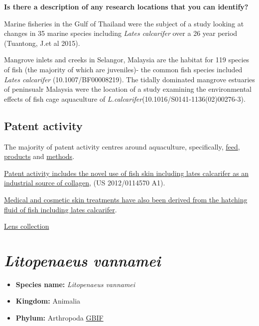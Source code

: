 \documentclass[]{book}
\providecommand{\tightlist}{%
  \setlength{\itemsep}{0pt}\setlength{\parskip}{0pt}}
\theoremstyle{definition}
\theoremstyle{definition}
\theoremstyle{definition}
\theoremstyle{remark}
\begin{document}
\textbf{Is there a description of any research locations that you can
identify?}

Marine fisheries in the Gulf of Thailand were the subject of a study
looking at changes in 35 marine species including \emph{Lates
calcarifer} over a 26 year period (Tuantong, J.et al 2015).

Mangrove inlets and creeks in Selangor, Malaysia are the habitat for 119
species of fish (the majority of which are juveniles)- the common fish
species included \emph{Lates calcarifer} (10.1007/BF00008219). The
tidally dominated mangrove estuaries of peninsualr Malaysia were the
location of a study examining the environmental effects of fish cage
aquaculture of \emph{L.calcarifer}(10.1016/S0141-1136(02)00276-3).

\hypertarget{patent-activity-1}{%
\subsection{Patent activity}\label{patent-activity-1}}

The majority of patent activity centres around aquaculture,
specifically, \href{WO\%202008/084074\%20A2}{feed},
\href{WO\%202010/027788\%20A1}{products} and
\href{WO\%202009/063044\%20A1}{methods}.

\href{US\%202012/0114570\%20A1}{Patent activity includes the novel use
of fish skin including lates calcarifer as an industrial source of
collagen}, (US 2012/0114570 A1).

\href{WO\%202014/094918\%20A1}{Medical and cosmetic skin treatments have
also been derived from the hatching fluid of fish including lates
calcarifer}.

\href{https://www.lens.org/lens/collection/25319}{Lens collection}

\hypertarget{litopenaeus-vannamei}{%
\section{\texorpdfstring{\emph{Litopenaeus
vannamei}}{Litopenaeus vannamei}}\label{litopenaeus-vannamei}}

\begin{itemize}
\tightlist
\item
  \textbf{Species name:} \emph{Litopenaeus vannamei}
\item
  \textbf{Kingdom:} Animalia
\item
  \textbf{Phylum:} Arthropoda
  \href{https://www.gbif.org/species/2223871}{GBIF}
\end{itemize}
\end{document}
